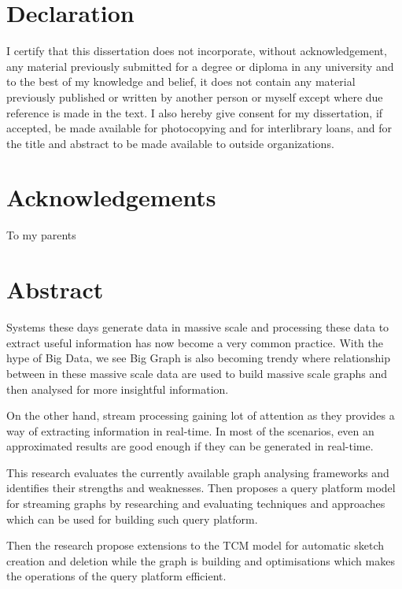 \documentclass[12pt]{report}
\numberwithin{figure}{section}
\numberwithin{table}{section}
\begin{document}
\section*{Declaration}
%

I certify that this dissertation does not incorporate, without acknowledgement, any material previously submitted for a degree or diploma in any university and to the best of my knowledge and belief, it does not contain any material previously published or written by another person or myself except where due reference is made in the text. I also hereby give consent for my dissertation, if accepted, be made available for photocopying and for interlibrary loans, and for the title and abstract to be made available to outside organizations.

\newpage

\section*{Acknowledgements}
%
To my parents
\newpage


\section*{Abstract}
%

Systems these days generate data in massive scale and processing these data to extract useful information has now become a very common practice. With the hype of Big Data, we see Big Graph is also becoming trendy where relationship between in these massive scale data are used to build massive scale graphs and then analysed for more insightful information.

On the other hand, stream processing gaining lot of attention as they provides a way of extracting information in real-time. In most of the scenarios, even an approximated results are good enough if they can be generated in real-time.

This research evaluates the currently available graph analysing frameworks and identifies their strengths and weaknesses. Then proposes a query platform model for streaming graphs by researching and evaluating techniques and approaches which can be used for building such query platform. 

Then the research propose extensions to the TCM model for automatic sketch creation and deletion while the graph is building and optimisations which makes the operations of the query platform efficient.
\end{document}
